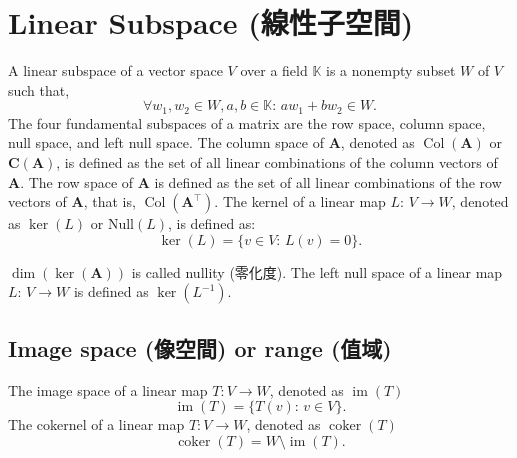 \documentclass[a4paper,12pt]{report}
\begin{document}
\section{Linear Subspace (線性子空間)}
A linear subspace of a vector space $V$ over a field $\mathbb{K}$ is a nonempty subset $W$ of $V$ such that, 
\[\forall w_1,w_2\in W,a,b\in\mathbb{K}:\,aw_1+bw_2\in W.\]
The four fundamental subspaces of a matrix are the row space, column space, null space, and left null space.
The column space of $\mathbf{A}$, denoted as \(\operatorname{Col}(\mathbf{A})\) or $\mathrm{\mathbf{C}}(\mathbf{A})$, is defined as the set of all linear combinations of the column vectors of $\mathbf{A}$.
The row space of $\mathbf{A}$ is defined as the set of all linear combinations of the row vectors of $\mathbf{A}$, that is, $\operatorname{Col}(\mathbf{A}^{\top})$.
The kernel of a linear map $L:\,V\to W$, denoted as $\ker(L)$ or $\mathrm{Null}(L)$, is defined as:
\[\ker(L)=\{v\in V:\,L(v)=0\}.\]

$\dim(\ker(\mathbf{A}))$ is called nullity (零化度).
The left null space of a linear map $L:\,V\to W$ is defined as $\ker(L^{-1})$.
\subsection{Image space (像空間) or range (值域)}
The image space of a linear map $T\colon V\to W$, denoted as $\operatorname{im}(T)$
\[\operatorname{im}(T)=\{T(v):\,v\in V\}.\]
The cokernel of a linear map $T\colon V\to W$, denoted as $\operatorname{coker}(T)$
\[\operatorname{coker}(T)=W\setminus\operatorname{im}(T).\]
\end{document}
